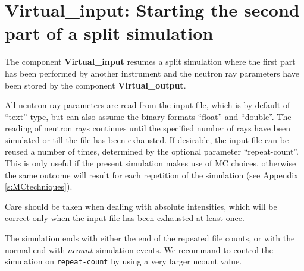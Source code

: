 \section{Virtual\_input: Starting the second part of a split simulation}
\label{virtual_input}


The component {\bf Virtual\_input} resumes a split simulation where the
first part has been performed by another instrument and the neutron ray
parameters have been stored by the component {\bf Virtual\_output}.

All neutron ray parameters are read from the input file, which is by default
of ``text'' type, but can also assume the binary formats
``float'' and ``double''. The reading of neutron rays continues until the
specified number of rays have been simulated or
till the file has been exhausted. If desirable, the input file
can be reused a number of times, determined by the optional parameter
``repeat-count''. This is only useful if the present simulation makes use of
MC choices, otherwise the same outcome will result for each repetition of the
simulation (see Appendix \ref{s:MCtechniques}).

Care should be taken when dealing with
absolute intensities, which will be correct only
when the input file has been exhausted at least once.

The simulation ends with either the end of the repeated file counts,
or with the normal end with $ncount$ \MCS simulation events. We recommand to
control the simulation on \verb+repeat-count+ by using
a very larger ncount value.
